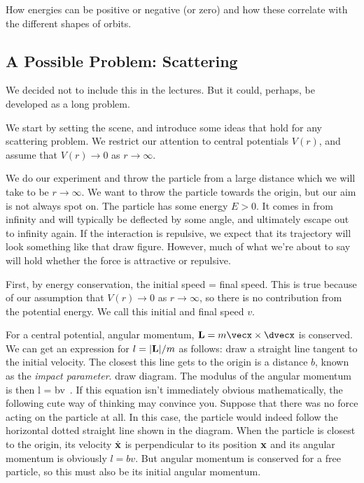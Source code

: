 How energies can be positive or negative (or zero) and how these correlate with the different shapes of orbits. 




\subsection{A Possible Problem: Scattering}

{\cblue We decided not to include this in the lectures. But it could, perhaps, be developed as a long problem.

\para
We start by setting the scene, and introduce  some ideas that hold for any scattering problem.  We restrict our attention to central potentials $V(r)$, and assume that $V(r)\rightarrow 0$ as $r\rightarrow \infty$. 




\para
We do our experiment and throw  the particle from a large distance which we will take to be $r\rightarrow \infty$. We want to throw the particle towards the origin, but our aim is not always spot on. The particle has some energy $E>0$. It comes in from infinity and will typically be deflected by some angle, and ultimately escape out to infinity again.  If the interaction is repulsive, we expect that its trajectory will look something like that {\cblue draw figure}. However, much of what we're about to say will hold whether the force is attractive or repulsive. 




\para
First, by energy conservation,  the initial speed = final speed. This is true because of our assumption that $V(r)\rightarrow 0$ as  $r\rightarrow \infty$, so there is no contribution from the potential energy. We call this initial and final speed $v$.

\para
For a central potential, angular momentum, ${\bf L} = m\vecx\times\dvecx$ is conserved. We can get an expression for $l=|{\bf L}|/m$ as follows: draw a straight line tangent to the initial velocity. The closest this line gets to the origin 
is  a distance $b$, known as the {\it impact parameter}. {\cblue draw diagram}. The modulus of the angular momentum is then 
%
\be l = bv\ .\label{lbv}\ee
%
If this equation isn't immediately obvious mathematically, the following cute way of thinking may convince you. Suppose that there was no force acting on the particle at all. In this case, the particle would indeed follow the horizontal dotted straight line shown in the diagram. When the particle is closest to the origin, its velocity $\dot{{\bf x}}$  is perpendicular to its position ${\bf x}$ and  its angular momentum is obviously $l=bv$.  But angular momentum is conserved for a free particle, so this must also be its initial angular momentum. 



}
